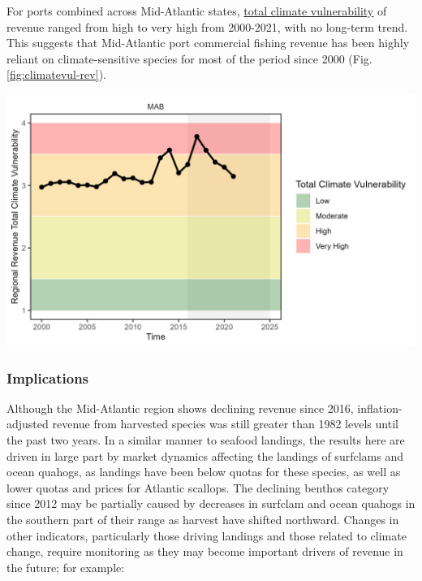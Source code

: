 \documentclass[
  10pt,
]{article}
\let\origfigure\figure
\let\endorigfigure\endfigure
\renewenvironment{figure}[1][2] {
    \expandafter\origfigure\expandafter[H]
} {
    \endorigfigure
}
\begin{document}
For ports combined across Mid-Atlantic states, \href{https://noaa-edab.github.io/catalog/community_climate_vulnerability.html}{total climate vulnerability} of revenue ranged from high to very high from 2000-2021, with no long-term trend. This suggests that Mid-Atlantic port commercial fishing revenue has been highly reliant on climate-sensitive species for most of the period since 2000 (Fig. \ref{fig:climatevul-rev}).

\begin{figure}

{\centering \includegraphics[width=6.5in]{images/MidAtlantic/climatevul_rev_MidAtlantic_2025-09-05} 

}

\caption{Mid-Atlantic region total climate vulnerability of commercial revenue (sum of Mid-Atlantic port revenue weighted by species climate vulnerability from Hare et al. 2016).}\label{fig:climatevul-rev}
\end{figure}

\subsubsection{Implications}\label{implications-1}

Although the Mid-Atlantic region shows declining revenue since 2016, inflation-adjusted revenue from harvested species was still greater than 1982 levels until the past two years. In a similar manner to seafood landings, the results here are driven in large part by market dynamics affecting the landings of surfclams and ocean quahogs, as landings have been below quotas for these species, as well as lower quotas and prices for Atlantic scallops. The declining benthos category since 2012 may be partially caused by decreases in surfclam and ocean quahogs in the southern part of their range as harvest have shifted northward. Changes in other indicators, particularly those driving landings and those related to climate change, require monitoring as they may become important drivers of revenue in the future; for example:
\end{document}
